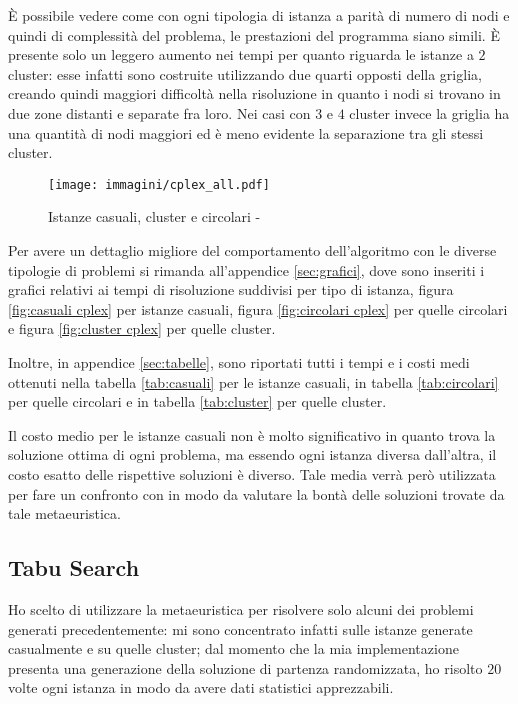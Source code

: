 È possibile vedere come con ogni tipologia di istanza a parità di numero di nodi e quindi di complessità del problema, le prestazioni del programma siano simili.
È presente solo un leggero aumento nei tempi per quanto riguarda le istanze a $2$ cluster: esse infatti sono costruite utilizzando due quarti opposti della griglia, creando quindi maggiori difficoltà nella risoluzione in quanto i nodi si trovano in due zone distanti e separate fra loro.
Nei casi con $3$ e $4$ cluster invece la griglia ha una quantità di nodi maggiori ed è meno evidente la separazione tra gli stessi cluster.

\begin{figure}[H]
	\centering
	\texttt{[image: immagini/cplex\_all.pdf]}
	\caption{Istanze casuali, cluster e circolari - }
	\label{fig:all cplex}
\end{figure}

Per avere un dettaglio migliore del comportamento dell'algoritmo con le diverse tipologie di problemi si rimanda all'appendice \ref{sec:grafici}, dove sono inseriti i grafici relativi ai tempi di risoluzione suddivisi per tipo di istanza, figura \ref{fig:casuali cplex} per istanze casuali, figura \ref{fig:circolari cplex} per quelle circolari e figura \ref{fig:cluster cplex} per quelle cluster.

Inoltre, in appendice \ref{sec:tabelle}, sono riportati tutti i tempi e i costi medi ottenuti nella tabella \ref{tab:casuali} per le istanze casuali, in tabella \ref{tab:circolari} per quelle circolari e in tabella \ref{tab:cluster} per quelle cluster.

Il costo medio per le istanze casuali non è molto significativo in quanto  trova la soluzione ottima di ogni problema, ma essendo ogni istanza diversa dall'altra, il costo esatto delle rispettive soluzioni è diverso.
Tale media verrà però utilizzata per fare un confronto con \tabu in modo da valutare la bontà delle soluzioni trovate da tale metaeuristica.


\subsection{Tabu Search}

Ho scelto di utilizzare la metaeuristica \tabu per risolvere solo alcuni dei problemi generati precedentemente: mi sono concentrato infatti sulle istanze generate casualmente e su quelle cluster; dal momento che la mia implementazione presenta una generazione della soluzione di partenza randomizzata, ho risolto $20$ volte ogni istanza in modo da avere dati statistici apprezzabili.


